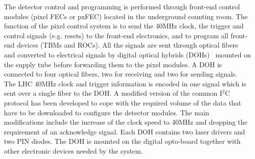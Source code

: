 The detector control and programming is performed through front-end control modules (pixel FECs or pxFEC) located in the underground counting room.
The function of the pixel control system is to send the 40\unit{MHz} clock, the trigger and control signals (e.g. resets) to the front-end electronics,
and to program all front-end devices (TBMs and ROCs).
All the signals are sent through optical fibers and converted to electrical signals by digital optical hybrids (DOHs)~\cite{1221923} mounted on the supply tube before forwarding them to the pixel modules.
A DOH is connected to four optical fibers, two for receiving and two for sending signals. The LHC 40\unit{MHz} clock and trigger information is encoded in one signal which is sent over a single fiber to the DOH. 
A modified version of the common I$^2$C protocol has been developed to cope with the required volume of the data that have to be downloaded to configure the detector modules.
The main modifications include the increase of the clock speed to 40\unit{MHz} and dropping the requirement of an acknowledge signal.
Each DOH contains two laser drivers and two PIN diodes. The DOH is mounted on the digital opto-board together with other electronic devices needed by the system.
